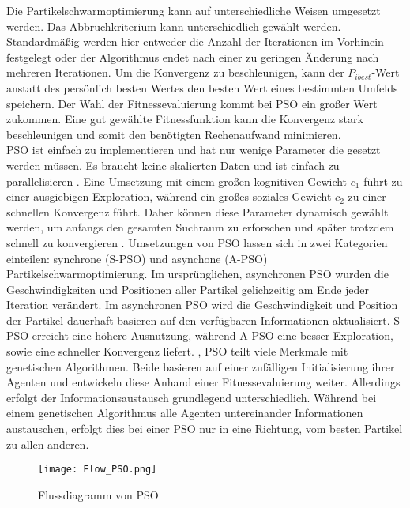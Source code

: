 Die Partikelschwarmoptimierung kann auf unterschiedliche Weisen umgesetzt werden.
Das Abbruchkriterium kann unterschiedlich gewählt werden. Standardmäßig werden hier entweder die Anzahl der Iterationen im Vorhinein festgelegt oder der Algorithmus endet nach einer zu geringen Änderung nach mehreren Iterationen. 
Um die Konvergenz zu beschleunigen, kann der $P_{ibest}$-Wert anstatt des persönlich besten Wertes den besten Wert eines bestimmten Umfelds speichern.
Der Wahl der Fitnessevaluierung kommt bei PSO ein großer Wert zukommen. Eine gut gewählte Fitnessfunktion kann die Konvergenz stark beschleunigen und somit den benötigten Rechenaufwand minimieren.\\
PSO ist einfach zu implementieren und hat nur wenige Parameter die gesetzt werden müssen. Es braucht keine skalierten Daten und ist einfach zu parallelisieren \cite{poli2007particle}.
Eine Umsetzung mit einem großen kognitiven Gewicht $c_1$ führt zu einer ausgiebigen Exploration, während ein großes soziales Gewicht $c_2$ zu einer schnellen Konvergenz führt. Daher können diese Parameter dynamisch gewählt werden, um anfangs den gesamten Suchraum zu erforschen und später trotzdem schnell zu konvergieren \cite{suganthan1999particle}. 
Umsetzungen von PSO lassen sich in zwei Kategorien einteilen: synchrone (S-PSO) und asynchone (A-PSO) Partikelschwarmoptimierung. Im ursprünglichen, asynchronen PSO wurden die Geschwindigkeiten und Positionen aller Partikel gelichzeitig am Ende jeder Iteration verändert. Im asynchronen PSO wird die Geschwindigkeit und Position der Partikel dauerhaft basieren auf den verfügbaren Informationen aktualisiert.  S-PSO erreicht eine höhere Ausnutzung, während A-PSO eine besser Exploration, sowie eine schneller Konvergenz liefert. \cite{carlisle2001g}, \cite{ab2014synchronous}
PSO teilt viele Merkmale mit genetischen Algorithmen. Beide basieren auf einer zufälligen Initialisierung ihrer Agenten und entwickeln diese Anhand einer Fitnessevaluierung weiter. Allerdings erfolgt der Informationsaustausch grundlegend unterschiedlich. Während bei einem genetischen Algorithmus alle Agenten untereinander Informationen austauschen, erfolgt dies bei einer PSO nur in eine Richtung, vom besten Partikel zu allen anderen.\\

\begin{figure}
  \centering
  \texttt{[image: Flow\_PSO.png]}
  \caption{Flussdiagramm von PSO}
  \label{fig:Figure_PSO}
\end{figure}

